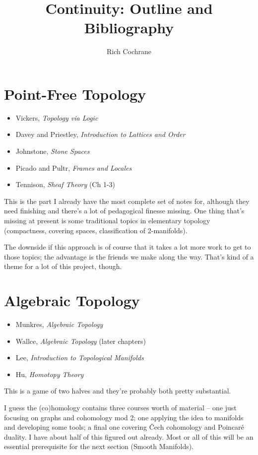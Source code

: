 \documentclass[article]{article}
\begin{document}
\title{Continuity: Outline and Bibliography}
\author{Rich Cochrane}
\maketitle

\section{Point-Free Topology}

\begin{itemize}
	\item{Vickers, \emph{Topology via Logic}}
	\item{Davey and Priestley, \textit{Introduction to Lattices and Order}}
	\item{Johnstone, \emph{Stone Spaces}}
	\item{Picado and Pultr, \emph{Frames and Locales}}
	\item{Tennison, \emph{Sheaf Theory} (Ch 1-3)}
\end{itemize}

This is the part I already have the most complete set of notes for, although they need finishing and there's a lot of pedagogical finesse missing. One thing that's missing at present is some traditional topics in elementary topology (compactness, covering spaces, classification of 2-manifolds). 

The downside if this approach is of course that it takes a lot more work to get to those topics; the advantage is the friends we make along the way. That's kind of a theme for a lot of this project, though.

\section{Algebraic Topology}

\begin{itemize}
	\item{Munkres, \textit{Algebraic Topology}}
	\item{Wallce, \textit{Algebraic Topology} (later chapters)}
	\item{Lee, \textit{Introduction to Topological Manifolds}}
	\item{Hu, \textit{Homotopy Theory}}
\end{itemize}

This is a game of two halves and they're probably both pretty substantial. 

I guess the (co)homology contains three courses worth of material -- one just focusing on graphs and cohomology mod 2; one applying the idea to manifolds and developing some tools; a final one covering \v{C}ech cohomology and Poincar\'e duality. I have about half of this figured out already. Most or all of this will be an essential prerequisite for the next section (Smooth Manifolds).
\end{document}
